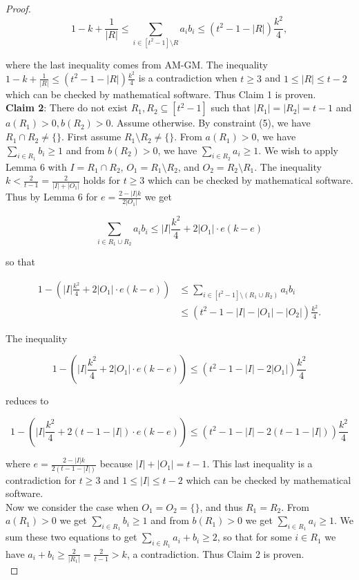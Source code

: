 \documentclass{article}
\begin{document}
\begin{proof}
$$1-k+\frac{1}{|R|} \leq \sum_{i \in [t^2-1] \setminus R} a_ib_i \leq (t^2-1-|R|)\frac{k^2}{4}, $$

\noindent
where the last inequality comes from AM-GM. The inequality $1-k+\frac{1}{|R|} \leq (t^2-1-|R|)\frac{k^2}{4}$ is a contradiction when $t \geq 3$ and $1 \leq |R| \leq t-2$ which can be checked by mathematical software. Thus Claim 1 is proven. \\

\textbf{Claim 2}: There do not exist $R_1,R_2 \subseteq [t^2-1]$ such that $|R_1| = |R_2| = t-1$ and $a(R_1) > 0, b(R_2) > 0$. Assume otherwise. By constraint (5), we have $R_1 \cap R_2 \neq \{\}$. First assume $R_1 \setminus R_2 \neq \{\}$. From $a(R_1) > 0$, we have $\sum_{i \in R_1} b_i \geq 1$ and from $b(R_2) > 0$, we have $\sum_{i \in R_2} a_i \geq 1$. We wish to apply Lemma 6 with $I = R_1 \cap R_2$, $O_1 = R_1 \setminus R_2$, and $O_2 = R_2 \setminus R_1$. The inequality $k < \frac{2}{t-1} = \frac{2}{|I|+|O_1|}$ holds for $t \geq 3$ which can be checked by mathematical software. Thus by Lemma 6 for $e = \frac{2-|I|k}{2|O_1|}$ we get

$$\sum_{i \in R_1 \cup R_2} a_ib_i \leq |I|\frac{k^2}{4} + 2|O_1| \cdot e(k-e)$$

\noindent 
so that

\begin{align*}
1-(|I|\frac{k^2}{4} + 2|O_1| \cdot e(k-e)) &\leq \sum_{i \in [t^2-1] \setminus (R_1 \cup R_2)} a_ib_i \\
&\leq (t^2 - 1 - |I| -|O_1|-|O_2|)\frac{k^2}{4}.
\end{align*}

The inequality 

$$1-(|I|\frac{k^2}{4} + 2|O_1| \cdot e(k-e)) \leq (t^2 - 1 - |I| -2|O_1|)\frac{k^2}{4}$$

\noindent
reduces to 

$$1-(|I|\frac{k^2}{4} + 2(t-1-|I|) \cdot e(k-e)) \leq (t^2 - 1 - |I| -2(t-1-|I|))\frac{k^2}{4}$$

\noindent
where $e = \frac{2-|I|k}{2(t-1-|I|)}$ because $|I| + |O_1| = t-1$. This last inequality is a contradiction for $t \geq 3$ and $1 \leq |I| \leq t-2$ which can be checked by mathematical software.  \\

Now we consider the case when $O_1 = O_2 = \{\}$, and thus $R_1 = R_2$. From $a(R_1) > 0$ we get $\sum_{i \in R_1} b_i \geq 1$ and from $b(R_1) > 0$ we get $\sum_{i \in R_1} a_i \geq 1$. We sum these two equations to get $\sum_{i \in R_1} a_i+b_i \geq 2$, so that for some $i \in R_1$ we have $a_i+b_i \geq \frac{2}{|R_1|} = \frac{2}{t-1} > k$, a contradiction. Thus Claim 2 is proven. \\


\end{proof}
\end{document}
